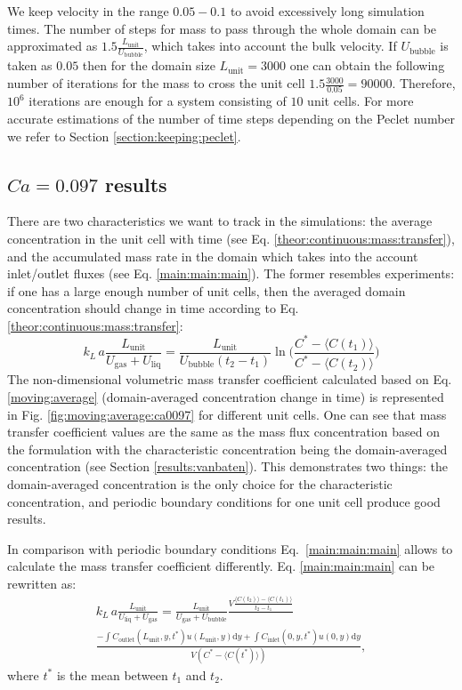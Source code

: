 \documentclass[review,12pt]{elsarticle}
\newcommand{\beq}{\begin{equation}}
\newcommand{\feq}{\end{equation}}
\newcommand{\vol}{k_L\,a}
\newcommand{\lunit}{L_{\mathrm{unit}}}
\newcommand{\ububble}{U_{\mathrm{bubble}}}
\newcommand{\uliq}{U_{\mathrm{liq}}}
\newcommand{\ugas}{U_{\mathrm{gas}}}
\newcommand{\cinlet}{C_{\mathrm{inlet}}}
\newcommand{\coutlet}{C_{\mathrm{outlet}}}
\newcommand{\cstar}{C^{*}}
\newcommand{\volnondim}{\vol \frac{\lunit}{\uliq+\ugas}}
\begin{document}
We keep velocity in the range $0.05-0.1$ to avoid excessively long simulation times.
The number of steps for mass to pass through the whole domain can be approximated as $1.5 \frac{\lunit}{\ububble}$, which takes into account the bulk
velocity. If $\ububble$ is taken as $0.05$ then for
the domain size $\lunit=3000$ one can obtain the following number of iterations for the mass to
cross the unit cell $1.5 \frac{3000}{0.05}=90000$. Therefore, $10^{6}$ iterations are enough
for a system consisting of $10$ unit cells. For more accurate estimations of the number of time
steps depending on the Peclet number we refer to Section \ref{section:keeping:peclet}.

\subsection{$Ca=0.097$ results}
There are two characteristics we want to track in the simulations: the average
concentration in
the unit cell with time (see Eq. \ref{theor:continuous:mass:transfer}), and the accumulated mass
rate in the domain which takes into the account inlet/outlet fluxes (see Eq. \ref{main:main:main}). The former
resembles experiments: if one has a large enough number of unit cells, then the averaged domain
concentration should change in time according to Eq. \ref{theor:continuous:mass:transfer}: 
\beq
\label{moving:average}
\vol\frac{\lunit}{\ugas+\uliq}=\frac{\lunit}{\ububble (t_2
-t_1)}\ln\biggl(\frac{C^*-\langle C(t_1) \rangle}{C^*-\langle C(t_2)\rangle}\biggr)
\feq
The non-dimensional volumetric mass transfer coefficient calculated based on Eq.
\ref{moving:average} (domain-averaged concentration change in time) is
represented in Fig. \ref{fig:moving:average:ca0097} for different unit cells. One can see that mass transfer coefficient values are the same as the mass flux
concentration based on the \citeauthor{vanbaten-circular} formulation with the characteristic
concentration being the domain-averaged concentration (see Section
\ref{results:vanbaten}). This demonstrates two things:  the domain-averaged
concentration is the only choice for the characteristic concentration, and
periodic boundary conditions for one unit cell produce good results.

In comparison with periodic boundary conditions Eq.~\ref{main:main:main} allows
to calculate the mass transfer coefficient differently. Eq.
\ref{main:main:main}  can be rewritten as: \beq
\label{main:main:main:thorough}
\begin{aligned}
\volnondim=\frac{\lunit}{\ugas+\ububble} \frac{V \frac{\langle C(t_2)\rangle - \langle C(t_1)
\rangle}{t_2-t_1}}{}\\
\frac{-\int{\coutlet(\lunit,y,t^*) u(\lunit,y) \mathrm{d} y}+\int{\cinlet(0,y,t^*)
u(0,y)\mathrm{d} y}}{V (\cstar - \langle C(t^*) \rangle)},
\end{aligned}
\feq
where $t^*$ is the mean between $t_1$ and $t_2$.
\end{document}
